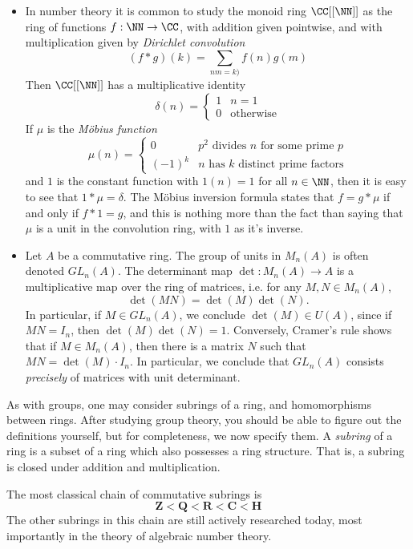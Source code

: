 \begin{itemize}
    \item In number theory it is common to study the monoid ring $\CC[[\NN]]$ as the ring of functions $f: \NN \to \CC$, with addition given pointwise, and with multiplication given by \emph{Dirichlet convolution}
    \[ (f * g)(k) = \sum_{nm = k)} f(n) g(m) \]
    Then $\CC[[\NN]]$ has a multiplicative identity
    \[ \delta(n) = \begin{cases} 1 & n = 1 \\ 0 & \text{otherwise} \end{cases} \]
    If $\mu$ is the {\it M\"{o}bius function}
    \[ \mu(n) = \begin{cases} 0 & \text{$p^2$ divides $n$ for some prime $p$} \\ (-1)^k & \text{$n$ has $k$ distinct prime factors} \end{cases} \]
    and $1$ is the constant function with $1(n) = 1$ for all $n \in \NN$, then it is easy to see that $1 * \mu = \delta$. The M\"{o}bius inversion formula states that $f = g * \mu$ if and only if $f * 1 = g$, and this is nothing more than the fact than saying that $\mu$ is a unit in the convolution ring, with $1$ as it's inverse.

    \item Let $A$ be a commutative ring. The group of units in $M_n(A)$ is often denoted $GL_n(A)$. The determinant map $\det: M_n(A) \to A$ is a multiplicative map over the ring of matrices, i.e. for any $M,N \in M_n(A)$,
    \[ \det(MN) = \det(M) \det(N). \]
    In particular, if $M \in GL_n(A)$, we conclude $\det(M) \in U(A)$, since if $MN = I_n$, then $\det(M) \det(N) = 1$. Conversely, Cramer's rule shows that if $M \in M_n(A)$, then there is a matrix $N$ such that $MN = \det(M) \cdot I_n$. In particular, we conclude that $GL_n(A)$ consists \emph{precisely} of matrices with unit determinant.
\end{itemize}
%
As with groups, one may consider subrings of a ring, and homomorphisms between rings. After studying group theory, you should be able to figure out the definitions yourself, but for completeness, we now specify them. A \emph{subring} of a ring is a subset of a ring which also possesses a ring structure. That is, a subring is closed under addition and multiplication.

\begin{example}
    The most classical chain of commutative subrings is
    \[ \mathbf{Z} < \mathbf{Q} < \mathbf{R} < \mathbf{C} < \mathbf{H} \]
    The other subrings in this chain are still actively researched today, most importantly in the theory of algebraic number theory.
\end{example}

